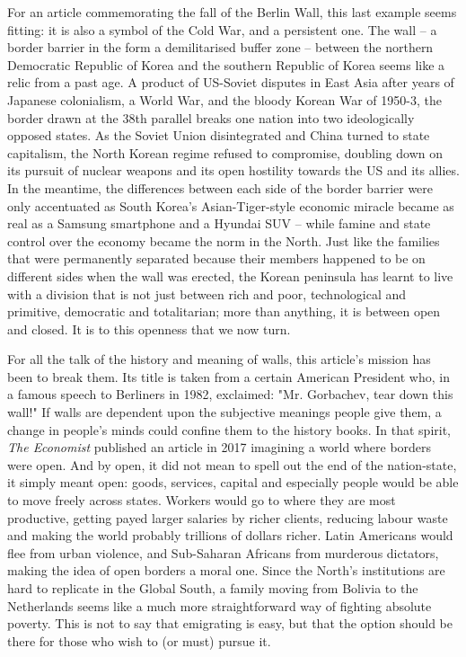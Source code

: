    For an article commemorating the fall of the Berlin Wall, this last
   example seems fitting: it is also a symbol of the Cold War, and a
   persistent one. The wall -- a border barrier in the form a
   demilitarised buffer zone -- between the northern Democratic Republic
   of Korea and the southern Republic of Korea seems like a relic from a
   past age. A product of US-Soviet disputes in East Asia after years of
   Japanese colonialism, a World War, and the bloody Korean War of 1950-3,
   the border drawn at the 38th parallel breaks one nation into two
   ideologically opposed states. As the Soviet Union disintegrated and
   China turned to state capitalism, the North Korean regime refused to
   compromise, doubling down on its pursuit of nuclear weapons and its
   open hostility towards the US and its allies. In the meantime, the
   differences between each side of the border barrier were only
   accentuated as South Korea's Asian-Tiger-style economic miracle became
   as real as a Samsung smartphone and a Hyundai SUV -- while famine and
   state control over the economy became the norm in the North. Just like
   the families that were permanently separated because their members
   happened to be on different sides when the wall was erected, the Korean
   peninsula has learnt to live with a division that is not just between
   rich and poor, technological and primitive, democratic and
   totalitarian; more than anything, it is between open and closed. It is to this openness that we now turn.

   For all the talk of the history and meaning of walls, this article's
   mission has been to break them. Its title is taken from a certain
   American President who, in a famous speech to Berliners in 1982,
   exclaimed: "Mr. Gorbachev, tear down this wall!" If walls are dependent
   upon the subjective meanings people give them, a change in
   people's minds could confine them to the history books. In that
   spirit, \textit{The Economist} published an article in
   2017 imagining a world where borders were open. And by open, it did not
   mean to spell out the end of the nation-state, it simply meant open: goods,
   services, capital and especially people would be able to move freely
   across states. Workers would go to where they are most productive,
   getting payed larger salaries by richer clients, reducing labour waste
   and making the world probably trillions of dollars richer. Latin
   Americans would flee from urban violence, and Sub-Saharan Africans from
   murderous dictators, making the idea of open borders a moral one. Since
   the North's institutions are hard to replicate in the Global South, a
   family moving from Bolivia to the Netherlands seems like a much more
   straightforward way of fighting absolute poverty. This is not to say
   that emigrating is easy, but that the option should be there for those
   who wish to (or must) pursue it.

